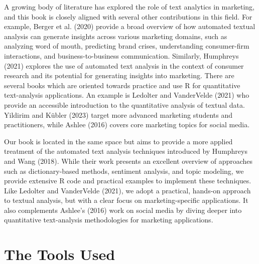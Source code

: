 A growing body of literature has explored the role of text analytics in marketing, and this book is closely aligned with several other contributions in this field. For example, Berger et al. (2020) provide a broad overview of how automated textual analysis can generate insights across various marketing domains, such as analyzing word of mouth, predicting brand crises, understanding consumer-firm interactions, and business-to-business communication. Similarly, Humphreys (2021) explores the use of automated text analysis in the context of consumer research and its potential for generating insights into marketing. There are several books which are oriented towards practice and use R for quantitative text-analysis applications. An example is Ledolter and VanderVelde (2021) who provide an accessible introduction to the quantitative analysis of textual data. Yildirim and Kübler (2023) target more advanced marketing students and practitioners, while Ashlee (2016) covers core marketing topics for social media.

Our book is located in the same space but aims to provide a more applied treatment of the automated text analysis techniques introduced by Humphreys and Wang (2018). While their work presents an excellent overview of approaches such as dictionary-based methods, sentiment analysis, and topic modeling, we provide extensive R code and practical examples to implement these techniques. Like Ledolter and VanderVelde (2021), we adopt a practical, hands-on approach to textual analysis, but with a clear focus on marketing-specific applications. It also complements Ashlee's (2016) work on social media by diving deeper into quantitative text-analysis methodologies for marketing applications.

\section{The Tools Used}\label{used-tools}

